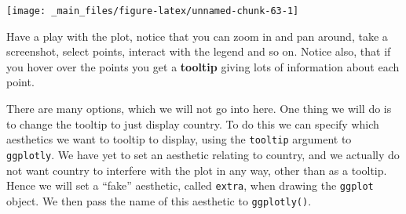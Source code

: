 \documentclass[]{book}
\newenvironment{Shaded}{\begin{snugshade}}{\end{snugshade}}
\newcommand{\KeywordTok}[1]{\textcolor[rgb]{0.13,0.29,0.53}{\textbf{{#1}}}}
\newcommand{\DataTypeTok}[1]{\textcolor[rgb]{0.13,0.29,0.53}{{#1}}}
\newcommand{\DecValTok}[1]{\textcolor[rgb]{0.00,0.00,0.81}{{#1}}}
\newcommand{\StringTok}[1]{\textcolor[rgb]{0.31,0.60,0.02}{{#1}}}
\newcommand{\NormalTok}[1]{{#1}}
\newcommand{\bblockT}[1]{\begin{tcolorbox}[title = Task #1]}
\newcommand{\eblockT}{\end{tcolorbox}}
\theoremstyle{definition}
\theoremstyle{definition}
\theoremstyle{definition}
\theoremstyle{remark}
\begin{document}
\begin{center}\texttt{[image: \_main\_files/figure-latex/unnamed-chunk-63-1]} \end{center}

\hypertarget{tsk8}{}\bblockT{8}

Have a play with the plot, notice that you can zoom in and pan around,
take a screenshot, select points, interact with the legend and so on.
Notice also, that if you hover over the points you get a
\textbf{tooltip} giving lots of information about each point. \eblockT

There are many options, which we will not go into here. One thing we
will do is to change the tooltip to just display country. To do this we
can specify which aesthetics we want to tooltip to display, using the
\texttt{tooltip} argument to \texttt{ggplotly}. We have yet to set an
aesthetic relating to country, and we actually do not want country to
interfere with the plot in any way, other than as a tooltip. Hence we
will set a ``fake'' aesthetic, called \texttt{extra}, when drawing the
\texttt{ggplot} object. We then pass the name of this aesthetic to
\texttt{ggplotly()}.

\begin{Shaded}
\end{Shaded}
\end{document}
